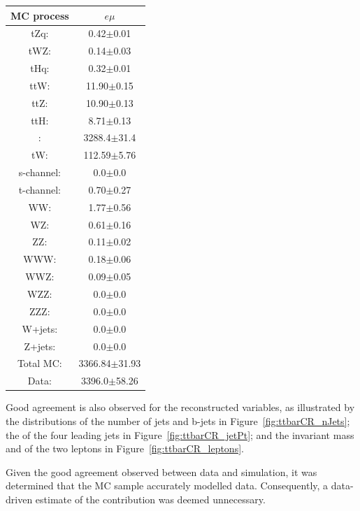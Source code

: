 \begin{table}[htbp]
\label{tab:ttbarCR}
  \centering
 \begin{tabular}{cc}
   \hline
   \textbf{MC process} & \textbf{$e\mu$}  \\
   \hline
	tZq\@: & 0.42$\pm$0.01  \\
	tWZ\@: & 0.14$\pm$0.03  \\
	tHq\@: & 0.32$\pm$0.01  \\
	ttW\@: & 11.90$\pm$0.15   \\
	ttZ\@: & 10.90$\pm$0.13   \\
	ttH\@: & 8.71$\pm$0.13  \\
	\ttbar: & 3288.4$\pm$31.4   \\
	tW\@: & 112.59$\pm$5.76   \\
	s-channel\@: &  0.0$\pm$0.0 \\
	t-channel\@: & 0.70$\pm$0.27 \\
	WW\@: & 1.77$\pm$0.56  \\
	WZ\@: & 0.61$\pm$0.16 \\
	ZZ\@: & 0.11$\pm$0.02 \\
	WWW\@: & 0.18$\pm$0.06     \\
	WWZ\@: & 0.09$\pm$0.05     \\
	WZZ\@: & 0.0$\pm$0.0     \\
	ZZZ\@: & 0.0$\pm$0.0     \\
	W+jets\@: & 0.0$\pm$0.0     \\
	Z+jets\@: & 0.0$\pm$0.0     \\
	\hline
	Total MC\@: & 3366.84$\pm$31.93     \\
	\hline
	Data\@: & 3396.0$\pm$58.26     \\
   \hline
 \end{tabular}
\end{table}

Good agreement is also observed for the reconstructed variables, as illustrated by the distributions of the number of jets and b-jets in Figure~\ref{fig:ttbarCR_nJets}; the \pT of the four leading jets in Figure~\ref{fig:ttbarCR_jetPt}; and the invariant mass and \pT of the two leptons in Figure~\ref{fig:ttbarCR_leptons}.

Given the good agreement observed between data and simulation, it was determined that the \ttbar MC sample accurately modelled data.
Consequently, a data-driven estimate of the \ttbar contribution was deemed unnecessary.

